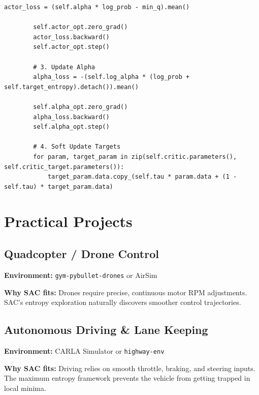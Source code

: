 \documentclass[12pt,a4paper]{article}
\theoremstyle{noteplain}
\theoremstyle{noteexercise}
\begin{document}
\begin{lstlisting}[caption={SAC Agent}, label={lst:sac}]
        actor_loss = (self.alpha * log_prob - min_q).mean()

        self.actor_opt.zero_grad()
        actor_loss.backward()
        self.actor_opt.step()

        # 3. Update Alpha
        alpha_loss = -(self.log_alpha * (log_prob + self.target_entropy).detach()).mean()

        self.alpha_opt.zero_grad()
        alpha_loss.backward()
        self.alpha_opt.step()

        # 4. Soft Update Targets
        for param, target_param in zip(self.critic.parameters(), self.critic_target.parameters()):
            target_param.data.copy_(self.tau * param.data + (1 - self.tau) * target_param.data)
\end{lstlisting}






\section{Practical Projects}\label{sec:projects}



\subsection{Quadcopter / Drone Control}\label{ssec:drone}



\textbf{Environment:} \texttt{gym-pybullet-drones} or AirSim

\textbf{Why SAC fits:} Drones require precise, continuous motor RPM adjustments. SAC's entropy exploration naturally discovers smoother control trajectories.



\subsection{Autonomous Driving \& Lane Keeping}\label{ssec:driving}



\textbf{Environment:} CARLA Simulator or \texttt{highway-env}

\textbf{Why SAC fits:} Driving relies on smooth throttle, braking, and steering inputs. The maximum entropy framework prevents the vehicle from getting trapped in local minima.
\end{document}
